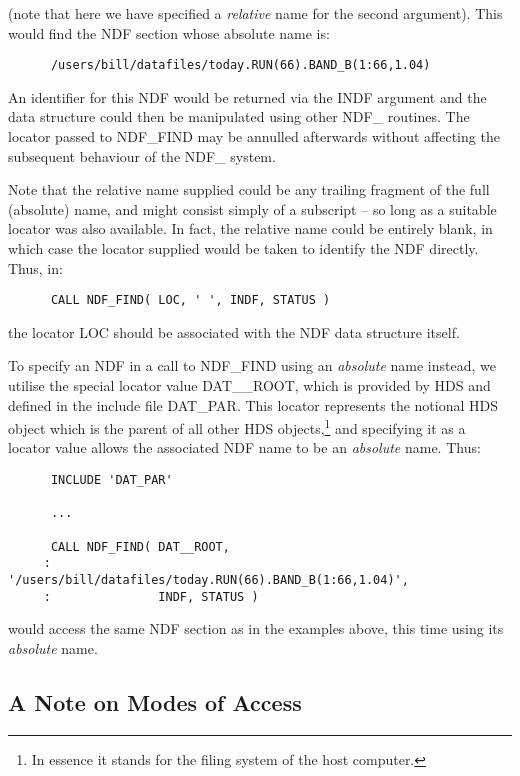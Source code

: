\documentclass[twoside,11pt]{article}
\newcommand{\xref}[3]{#1}
\newcommand{\xlabel}[1]{}
\newcommand{\st}[1]{{\em{#1}}}
\begin{document}
(note that here we have specified a \st{relative\/} name for the second
argument). This would find the NDF section whose absolute name is:

\small
\begin{verbatim}
      /users/bill/datafiles/today.RUN(66).BAND_B(1:66,1.04)
\end{verbatim}
\normalsize

An identifier for this NDF would be returned via the INDF argument and
the data structure could then be manipulated using other NDF\_
routines.  The locator passed to NDF\_FIND may be annulled afterwards
without affecting the subsequent behaviour of the NDF\_ system.

Note that the relative name supplied could be any trailing fragment of
the full (absolute) name, and might consist simply of a subscript --
so long as a suitable locator was also available. In fact, the
relative name could be entirely blank, in which case the locator
supplied would be taken to identify the NDF directly. Thus, in:

\small
\begin{verbatim}
      CALL NDF_FIND( LOC, ' ', INDF, STATUS )
\end{verbatim}
\normalsize

the locator LOC should be associated with the NDF data structure
itself.

To specify an NDF in a call to NDF\_FIND using an \st{absolute\/}
name instead, we utilise the special locator value DAT\_\_ROOT, which
is provided by \xref{HDS}{sun92}{} and defined in the include file
DAT\_PAR. This locator represents the notional HDS object which is the
parent of all other HDS objects,\footnote{In essence it stands for the
filing system of the host computer.} and specifying it as a locator
value allows the associated NDF name to be an \st{absolute\/}
name. Thus:

\small
\begin{verbatim}
      INCLUDE 'DAT_PAR'

      ...

      CALL NDF_FIND( DAT__ROOT,
     :               '/users/bill/datafiles/today.RUN(66).BAND_B(1:66,1.04)',
     :               INDF, STATUS )
\end{verbatim}
\normalsize

would access the same NDF section as in the examples above, this time
using its \st{absolute\/} name.

\subsection{\xlabel{a_note_on_modes_of_access}A Note on Modes of Access}
\end{document}
